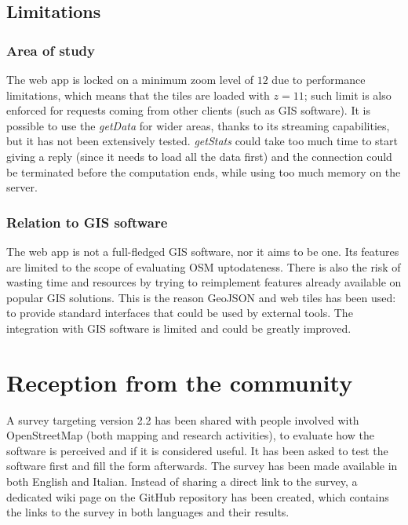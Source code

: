 \documentclass{Configuration_Files/PoliMi3i_thesis}
\begin{document}
\section{Limitations}

\subsection{Area of study}

The web app is locked on a minimum zoom level of $ 12 $ due to performance limitations, which means that the tiles are loaded with $ z = 11 $; such limit is also enforced for requests coming from other clients (such as GIS software). It is possible to use the \textit{getData} for wider areas, thanks to its streaming capabilities, but it has not been extensively tested. \textit{getStats} could take too much time to start giving a reply (since it needs to load all the data first) and the connection could be terminated before the computation ends, while using too much memory on the server.

\subsection{Relation to GIS software}

The web app is not a full-fledged GIS software, nor it aims to be one. Its features are limited to the scope of evaluating OSM uptodateness. There is also the risk of wasting time and resources by trying to reimplement features already available on popular GIS solutions. This is the reason GeoJSON and web tiles has been used: to provide standard interfaces that could be used by external tools. The integration with GIS software is limited and could be greatly improved.

\chapter{Reception from the community}
\label{ch:reception_from_the_community}

A survey targeting version 2.2 \cite{SurveySondaggioFrafra} has been shared with people involved with OpenStreetMap (both mapping and research activities), to evaluate how the software is perceived and if it is considered useful. It has been asked to test the software first and fill the form afterwards. The survey has been made available in both English and Italian. Instead of sharing a direct link to the survey, a dedicated wiki page on the GitHub repository has been created, which contains the links to the survey in both languages and their results.
\end{document}
